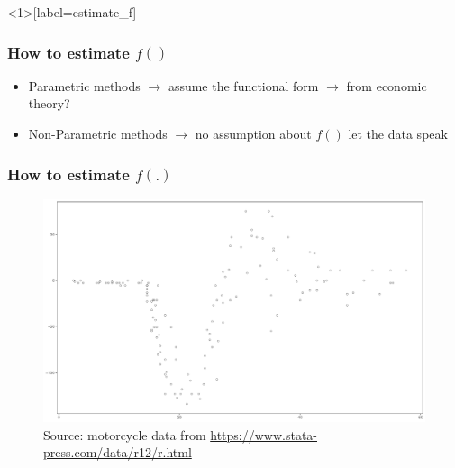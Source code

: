 \documentclass[
  shownotes,
  xcolor={svgnames},
  hyperref={colorlinks,citecolor=DarkBlue,linkcolor=DarkRed,urlcolor=DarkBlue}
  ]{beamer}
\begin{document}

\begin{frame}<1>[label=estimate_f]
\frametitle{How to estimate $f()$}


\begin{itemize}
  \item Parametric methods $\rightarrow$ assume the functional form $\rightarrow$ from economic theory?
  \pause
  \medskip
  \item Non-Parametric methods $\rightarrow$ no assumption about $f()$ let the data speak
    
\end{itemize}

\end{frame}




\begin{frame}
\frametitle{How to estimate $f(.)$}




\begin{figure}[H] \centering
  \centering
  \includegraphics[scale=0.25]{figures/fig_1.pdf}
  \\
  \tiny
  Source: motorcycle data from \url{https://www.stata-press.com/data/r12/r.html}
\end{figure}


\end{frame}

\end{document}
